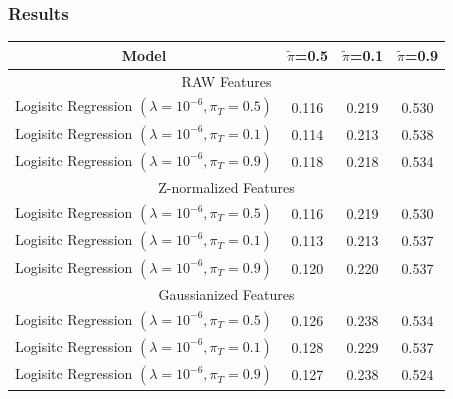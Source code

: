 \documentclass[12pt,a4paper]{article}
\begin{document}
\clearpage

\subsubsection{Results}

\begin{center}
    \renewcommand{\arraystretch}{1.2}
    \begin{tabular}{@{}cccc@{}}
        Model                                                    & \(\tilde{\pi}\)=0.5   & \(\tilde{\pi}\)=0.1  & \(\tilde{\pi}\)=0.9   \\ [0.5ex]

        \hline
        \multicolumn{4}{c}{RAW Features}                                                                                                \\
        \hline
        Logisitc Regression \((\lambda = 10^{-6}, \pi_T = 0.5)\) & {\color{blue} 0.116 } & 0.219                & {\color{blue} 0.530 } \\
        Logisitc Regression \((\lambda = 10^{-6}, \pi_T = 0.1)\) & {\color{blue} 0.114 } & {\color{red} 0.213 } & 0.538                 \\
        Logisitc Regression \((\lambda = 10^{-6}, \pi_T = 0.9)\) & {\color{blue} 0.118 } & 0.218                & 0.534                 \\

        \hline
        \multicolumn{4}{c}{Z-normalized Features}                                                                                       \\
        \hline
        Logisitc Regression \((\lambda = 10^{-6}, \pi_T = 0.5)\) & {\color{blue} 0.116 } & 0.219                & {\color{blue} 0.530 } \\
        Logisitc Regression \((\lambda = 10^{-6}, \pi_T = 0.1)\) & {\color{red} 0.113 }  & {\color{red} 0.213 } & 0.537                 \\
        Logisitc Regression \((\lambda = 10^{-6}, \pi_T = 0.9)\) & 0.120                 & 0.220                & 0.537                 \\

        \hline
        \multicolumn{4}{c}{Gaussianized Features}                                                                                       \\
        \hline
        Logisitc Regression \((\lambda = 10^{-6}, \pi_T = 0.5)\) & 0.126                 & 0.238                & 0.534                 \\
        Logisitc Regression \((\lambda = 10^{-6}, \pi_T = 0.1)\) & 0.128                 & 0.229                & 0.537                 \\
        Logisitc Regression \((\lambda = 10^{-6}, \pi_T = 0.9)\) & 0.127                 & 0.238                & {\color{red} 0.524 }  \\


\end{tabular}
\end{center}
\end{document}
